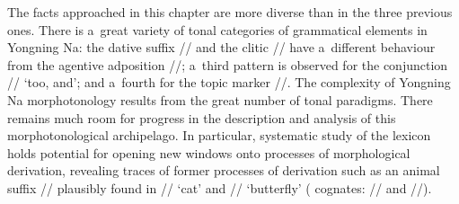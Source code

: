 The facts approached in this chapter are more diverse than in the three previous ones. There is a~great variety of tonal categories of grammatical elements in Yongning Na: the dative suffix // and the  clitic // have a~different behaviour from the agentive adposition //; a~third pattern is observed for the conjunction // ‘too, and’; and a~fourth for the topic marker //. The complexity of
Yongning Na morphotonology results from the great number of tonal paradigms.
There remains much room for progress in the description and analysis of this morphotonological archipelago. In particular, systematic study of the lexicon holds potential for opening new windows onto processes of morphological derivation, revealing traces of former processes of derivation such as an animal suffix // plausibly found in // ‘cat' and // ‘butterfly' ( cognates: // and //). 